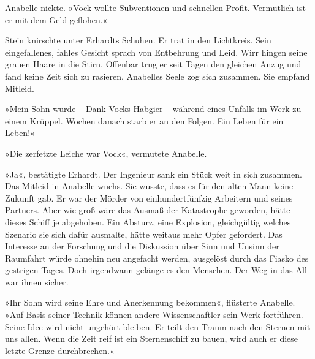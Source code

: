 Anabelle nickte. »Vock wollte Subventionen und schnellen Profit.
Vermutlich ist er mit dem Geld geflohen.«

Stein knirschte unter Erhardts Schuhen. Er trat in den Lichtkreis.
Sein eingefallenes, fahles Gesicht sprach von Entbehrung und Leid.
Wirr hingen seine grauen Haare in die Stirn. Offenbar trug er seit
Tagen den gleichen Anzug und fand keine Zeit sich zu rasieren.
Anabelles Seele zog sich zusammen. Sie empfand Mitleid.

»Mein Sohn wurde – Dank Vocks Habgier – während eines Unfalls im
Werk zu einem Krüppel. Wochen danach starb er an den Folgen. Ein
Leben für ein Leben!«

»Die zerfetzte Leiche war Vock«, vermutete Anabelle.

»Ja«, bestätigte Erhardt. Der Ingenieur sank ein Stück weit in sich
zusammen. Das Mitleid in Anabelle wuchs. Sie wusste, dass es für
den alten Mann keine Zukunft gab. Er war der Mörder von
einhundertfünfzig Arbeitern und seines Partners. Aber wie groß wäre
das Ausmaß der Katastrophe geworden, hätte dieses Schiff je
abgehoben. Ein Absturz, eine Explosion, gleichgültig welches
Szenario sie sich dafür ausmalte, hätte weitaus mehr Opfer
gefordert. Das Interesse an der Forschung und die Diskussion über
Sinn und Unsinn der Raumfahrt würde ohnehin neu angefacht werden,
ausgelöst durch das Fiasko des gestrigen Tages. Doch irgendwann
gelänge es den Menschen. Der Weg in das All war ihnen sicher.

\bigpar

»Ihr Sohn wird seine Ehre und Anerkennung bekommen«, flüsterte
Anabelle. »Auf Basis seiner Technik können andere Wissenschaftler
sein Werk fortführen. Seine Idee wird nicht ungehört bleiben. Er
teilt den Traum nach den Sternen mit uns allen. Wenn die Zeit reif
ist ein Sternenschiff zu bauen, wird auch er diese letzte Grenze
durchbrechen.«



